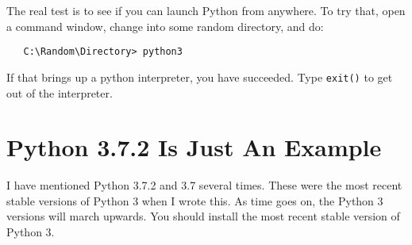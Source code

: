 The real test is to see if you can launch Python from anywhere. To try
that, open a command window, change into some random directory, and
do:

\begin{verbatim}
   C:\Random\Directory> python3
\end{verbatim}

If that brings up a python interpreter, you have succeeded.
Type \texttt{exit()} to get out of the interpreter.

\section{Python 3.7.2 Is Just An Example}

I have mentioned Python 3.7.2 and 3.7 several times. These were the
most recent stable versions of Python 3 when I wrote this. As time
goes on, the Python 3 versions will march upwards. You should install
the most recent stable version of Python 3.
